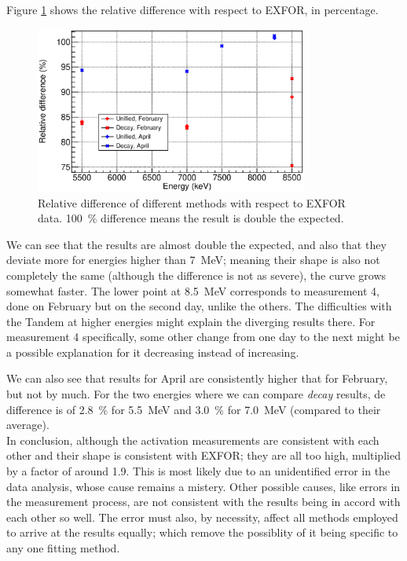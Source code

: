 \documentclass[a4paper,12pt]{report}
\begin{document}
Figure \ref{activation_result_diffs} shows the relative difference with respect to EXFOR, in percentage.

\begin{figure}[H]
	\centering
	\includegraphics[width=0.80\textwidth]{activation_result_diffs.eps}
	\caption{Relative difference of different methods with respect to EXFOR data.
	\qty{+100}{\percent} difference means the result is double the expected.}
	\label{activation_result_diffs}
\end{figure}

We can see that the results are almost double the expected, and also that they deviate more for energies higher than \qty{7}{\MeV}; meaning their shape is also not completely the same (although the difference is not as severe), the curve grows somewhat faster.
The lower point at \qty{8.5}{\MeV} corresponds to measurement 4, done on February but on the second day, unlike the others.
The difficulties with the Tandem at higher energies might explain the diverging results there.
For measurement 4 specifically, some other change from one day to the next might be a possible explanation for it decreasing instead of increasing.

We can also see that results for April are consistently higher that for February, but not by much.
For the two energies where we can compare \textit{decay} results, de difference is of \qty{2.8}{\percent} for \qty{5.5}{\MeV} and \qty{3.0}{\percent} for \qty{7.0}{\MeV} (compared to their average).
\\

In conclusion, although the activation measurements are consistent with each other and their shape is consistent with EXFOR; they are all too high, multiplied by a factor of around \num{1.9}.
This is most likely due to an unidentified error in the data analysis, whose cause remains a mistery.
Other possible causes, like errors in the measurement process, are not consistent with the results being in accord with each other so well.
The error must also, by necessity, affect all methods employed to arrive at the results equally; which remove the possiblity of it being specific to any one fitting method.
\end{document}

